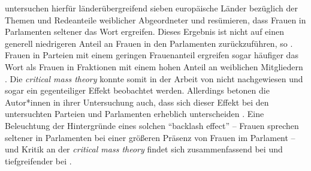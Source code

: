 \documentclass[12pt, 
    twoside=false, 
    bibliography=totoc, 
    numbers=endperiod, 
    headings=normal, 
    toc=chapterentrydotfill
    ]{scrbook}
\begin{document}
\textcite{back_2018} untersuchen hierfür länderübergreifend sieben europäische Länder bezüglich der Themen und Redeanteile weiblicher Abgeordneter und resümieren, dass Frauen in Parlamenten seltener das Wort ergreifen. Dieses Ergebnis ist nicht auf einen generell niedrigeren Anteil an Frauen in den Parlamenten zurückzuführen, so \textcite{back_2018}. Frauen in Parteien mit einem geringen Frauenanteil ergreifen sogar häufiger das Wort als Frauen in Fraktionen mit einem hohen Anteil an weiblichen Mitgliedern \parencite*[17]{back_2018}. Die \emph{critical mass theory} konnte somit in der Arbeit von \textcite{back_2018} nicht nachgewiesen und sogar ein gegenteiliger Effekt beobachtet werden. Allerdings betonen die Autor*innen in ihrer Untersuchung auch, dass sich dieser Effekt bei den untersuchten Parteien und Parlamenten erheblich unterscheiden \parencite[17]{back_2018}. Eine Beleuchtung der Hintergründe eines solchen \enquote{backlash effect} -- Frauen sprechen seltener in Parlamenten bei einer größeren Präsenz von Frauen im Parlament -- und Kritik an der \emph{critical mass theory} findet sich zusammenfassend bei \textcite[4]{back_2018} und tiefgreifender bei \textcite{childs_2008}.
\end{document}
